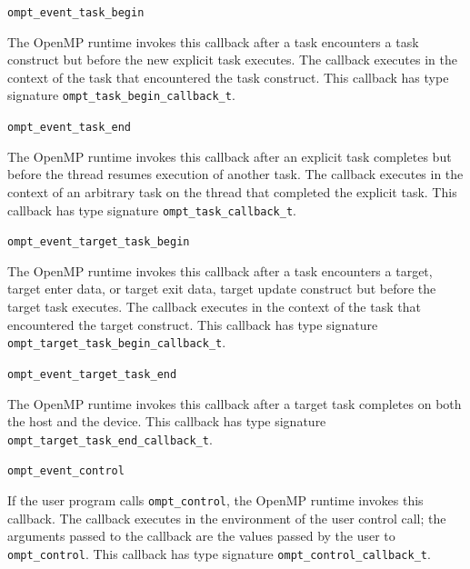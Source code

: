 \documentclass{article}
\newcommand{\descheader}[1]{{\needspace{3\baselineskip}\vspace{1em}\noindent \fbox{#1}}}
\begin{document}
\descheader{Tasks}

\begin{description}

\item \verb|ompt_event_task_begin|
 
The OpenMP runtime invokes this callback
after a task encounters a task construct
but before the new explicit task 
executes. The callback executes in the context of
the task that encountered the task construct.
This callback has type signature \verb|ompt_task_begin_callback_t|.

\item \verb|ompt_event_task_end|   
 
\sloppy
The OpenMP runtime invokes this callback
after an explicit task completes 
but before the thread resumes execution of another task.  
The callback executes in the context of an
arbitrary task on the thread that completed the explicit task.
This callback has type signature \verb|ompt_task_callback_t|. 

\item \verb|ompt_event_target_task_begin|
 
The OpenMP runtime invokes this callback after a task encounters a target, target enter data, or target exit data, target update
construct but before the target task executes. The callback executes in the 
context of the task that encountered the target construct.
This callback has type signature \verb|ompt_target_task_begin_callback_t|.

\item \verb|ompt_event_target_task_end|   
 
\sloppy
The OpenMP runtime invokes this callback after a target task completes on both the host and the device.
This callback has type signature \verb|ompt_target_task_end_callback_t|.

\end{description}


\descheader{Application Tool Control}

\begin{description}

\item \verb|ompt_event_control|

If the user program calls \verb|ompt_control|, the
OpenMP runtime invokes this callback.
The callback executes in the environment
of the user control call; the arguments passed to the callback are the values passed by the user to \verb|ompt_control|.
This callback has type signature \verb|ompt_control_callback_t|. 

\end{description}
\end{document}
